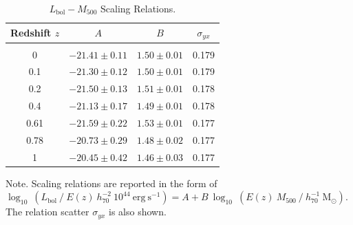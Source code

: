 \documentclass[traditabstract]{aa}
\newcommand{\rmn}{\mathrm}
\begin{document}
\begin{table}[t]
\begin{center}
\caption{$L_{\rmn{bol}}-M_{500}$ Scaling Relations.}
\medskip
\begin{tabular}{cccc}
\hline
\phantom{\Big|}
Redshift $z$ & $A$ & $B$ & $\sigma_{yx}$ \\
\hline \\[-0.5em]
 0      & $-21.41\pm0.11$ & $1.50\pm0.01$ & 0.179\\
 0.1   & $-21.30\pm0.12$ & $1.50\pm0.01$ & 0.179\\
 0.2   & $-21.50\pm0.13$ & $1.51\pm0.01$ & 0.178\\ 
 0.4   & $-21.13\pm0.17$ & $1.49\pm0.01$ & 0.178\\ 
 0.61 & $-21.59\pm0.22$ & $1.53\pm0.01$ & 0.177\\ 
 0.78 & $-20.73\pm0.29$ & $1.48\pm0.02$ & 0.177\\ 
 1      & $-20.45\pm0.42$ & $1.46\pm0.03$ & 0.177\\[0.5em]
\hline
\end{tabular}
\label{tab:LMfits}
\end{center}
\footnotesize{Note. Scaling relations are reported in the form of $\log_{10}~(L_{\rmn{bol}}~/~E(z)~h_{70}^{-2}~10^{44}~\rmn{erg~s}^{-1})=A+B~\log_{10}~(E(z)~M_{500}~/~h_{70}^{-1}~\rmn{M_{\odot}})$. The relation scatter $\sigma_{yx}$ is also shown.}
\end{table}
\end{document}
